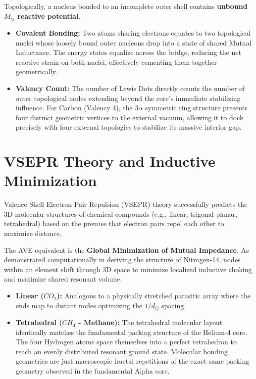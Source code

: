 Topologically, a nucleus bonded to an incomplete outer shell contains \textbf{unbound $M_{ij}$ reactive potential}. 
\begin{itemize}
    \item \textbf{Covalent Bonding:} Two atoms sharing electrons equates to two topological nuclei whose loosely bound outer nucleons drop into a state of shared Mutual Inductance. The energy states equalize across the bridge, reducing the net reactive strain on both nuclei, effectively cementing them together geometrically.
    \item \textbf{Valency Count:} The number of Lewis Dots directly counts the number of outer topological nodes extending beyond the core's immediate stabilizing influence. For Carbon (Valency 4), the $3\alpha$ symmetric ring structure presents four distinct geometric vertices to the external vacuum, allowing it to dock precisely with four external topologies to stabilize its massive interior gap.
\end{itemize}

\section{VSEPR Theory and Inductive Minimization}
Valence Shell Electron Pair Repulsion (VSEPR) theory successfully predicts the 3D molecular structures of chemical compounds (e.g., linear, trigonal planar, tetrahedral) based on the premise that electron pairs repel each other to maximize distance.

The AVE equivalent is the \textbf{Global Minimization of Mutual Impedance}. As demonstrated computationally in deriving the structure of Nitrogen-14, nodes within an element shift through 3D space to minimize localized inductive choking and maximize shared resonant volume.

\begin{itemize}
    \item \textbf{Linear ($CO_2$):} Analogous to a physically stretched parasitic array where the ends map to distant nodes optimizing the $1/d_{ij}$ spacing.
    \item \textbf{Tetrahedral ($CH_4$ - Methane):} The tetrahedral molecular layout identically matches the fundamental packing structure of the Helium-4 core. The four Hydrogen atoms space themselves into a perfect tetrahedron to reach an evenly distributed resonant ground state. Molecular bonding geometries are just macroscopic fractal repetitions of the exact same packing geometry observed in the fundamental Alpha core.
\end{itemize}

